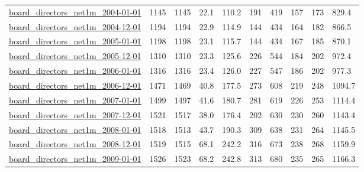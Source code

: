 \begin{longtable}{llllllllll}
 \href{http://www.boardsandgender.com/data.php}{board\_directors\_net1m\_2004-01-01}                                           & 1145       & 1145  & 22.1   & 110.2  & 191   & 419    & 157    & 173    & 829.4   \\
 \href{http://www.boardsandgender.com/data.php}{board\_directors\_net1m\_2004-12-01}                                           & 1194       & 1194  & 22.9   & 114.9  & 144   & 434    & 164    & 182    & 866.5   \\
 \href{http://www.boardsandgender.com/data.php}{board\_directors\_net1m\_2005-01-01}                                           & 1198       & 1198  & 23.1   & 115.7  & 144   & 434    & 167    & 185    & 870.1   \\
 \href{http://www.boardsandgender.com/data.php}{board\_directors\_net1m\_2005-12-01}                                           & 1310       & 1310  & 23.3   & 125.6  & 226   & 544    & 184    & 202    & 972.4   \\
 \href{http://www.boardsandgender.com/data.php}{board\_directors\_net1m\_2006-01-01}                                           & 1316       & 1316  & 23.4   & 126.0  & 227   & 547    & 186    & 202    & 977.3   \\
 \href{http://www.boardsandgender.com/data.php}{board\_directors\_net1m\_2006-12-01}                                           & 1471       & 1469  & 40.8   & 177.5  & 273   & 608    & 219    & 248    & 1094.7  \\
 \href{http://www.boardsandgender.com/data.php}{board\_directors\_net1m\_2007-01-01}                                           & 1499       & 1497  & 41.6   & 180.7  & 281   & 619    & 226    & 253    & 1114.4  \\
 \href{http://www.boardsandgender.com/data.php}{board\_directors\_net1m\_2007-12-01}                                           & 1521       & 1517  & 38.0   & 176.4  & 202   & 630    & 230    & 260    & 1143.4  \\
 \href{http://www.boardsandgender.com/data.php}{board\_directors\_net1m\_2008-01-01}                                           & 1518       & 1513  & 43.7   & 190.3  & 309   & 638    & 231    & 264    & 1145.5  \\
 \href{http://www.boardsandgender.com/data.php}{board\_directors\_net1m\_2008-12-01}                                           & 1519       & 1515  & 68.1   & 242.2  & 316   & 673    & 238    & 268    & 1159.9  \\
 \href{http://www.boardsandgender.com/data.php}{board\_directors\_net1m\_2009-01-01}                                           & 1526       & 1523  & 68.2   & 242.8  & 313   & 680    & 235    & 265    & 1166.3  \\

\end{longtable}
